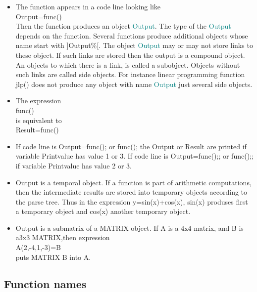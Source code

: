 \begin{itemize}

\item The function appears in a code line looking like\\
Output=func()\\
Then the function produces an object \textcolor{teal}{Output}. The type of the \textcolor{teal}{Output} depends on the function.
Several functions produce additional objects whose name start with ]Output\%[. The
object \textcolor{teal}{Output} may or may not store links to these object. If such links are
stored then the output is a compound object. An objects to which there is a link, is called a subobject.
Objects without such links are called side objects. For instance linear programming function \textcolor{VioletRed}{jlp}()
does not produce any object with name \textcolor{teal}{Output} just several side objects.

\item The expression \\
func()\\
is equivalent to\\
Result=func()
\item If code line is Output=func(); or func(); the Output or Result are printed if
variable Printvalue has value 1 or 3.  If code line is Output=func();; or func();;
if variable Printvalue has value 2 or 3.

\item Output is a temporal object. If a function is part of arithmetic computations, then
the intermediate results are stored into temporary objects according to the parse tree. Thus in the
expression y=\textcolor{VioletRed}{sin}(x)+\textcolor{VioletRed}{cos}(x), \textcolor{VioletRed}{sin}(x) produses first a temporary object and \textcolor{VioletRed}{cos}(x)
another temporary object.
\item Output is a submatrix of a MATRIX object. If A is a 4x4 matrix, and
B is a3x3 MATRIX,then expression\\
A(2,-4,1,-3)=B\\
puts MATRIX B into A.
\end{itemize}
\subsection{Function names}
\label{functionname}

